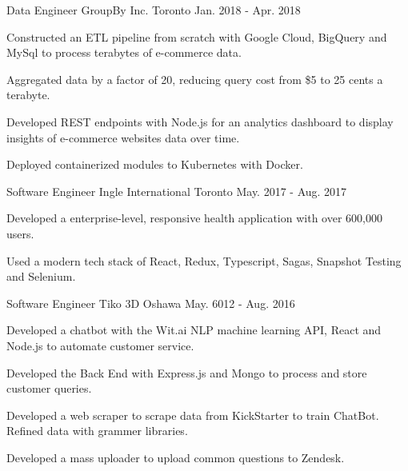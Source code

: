 \begin{cventries}
  \cventry
    {Data Engineer}
    {GroupBy Inc.}
    {Toronto}
    {Jan. 2018 -  Apr. 2018}
    {
      \begin{cvitems}
        \item {Constructed an ETL pipeline from scratch with Google Cloud, BigQuery and MySql to process terabytes of e-commerce data.}
        \item {Aggregated data by a factor of 20, reducing query cost from \$5 to 25 cents a terabyte.}
        \item {Developed REST endpoints with Node.js for an analytics dashboard to display insights of e-commerce websites data over time.}
        \item {Deployed containerized modules to Kubernetes with Docker.}
      \end{cvitems}
    }
  \cventry
    {Software Engineer}
    {Ingle International}
    {Toronto}
    {May. 2017 - Aug. 2017}
    {
      \begin{cvitems}
        \item {Developed a enterprise-level, responsive health application with over 600,000 users.}
        \item {Used a modern tech stack of React, Redux, Typescript, Sagas, Snapshot Testing and Selenium.}
      \end{cvitems}
    }
  \cventry
    {Software Engineer}
    {Tiko 3D}
    {Oshawa}
    {May. 6012 - Aug. 2016}
    {
      \begin{cvitems}
        \item {Developed a chatbot with the Wit.ai NLP machine learning API, React and Node.js to automate customer service.}
        \item {Developed the Back End with Express.js and Mongo to process and store customer queries.}
        \item {Developed a web scraper to scrape  data from KickStarter to train ChatBot. Refined data with grammer libraries.}
        \item {Developed a mass uploader to upload common questions to Zendesk.}
      \end{cvitems} 
    }
\end{cventries}
